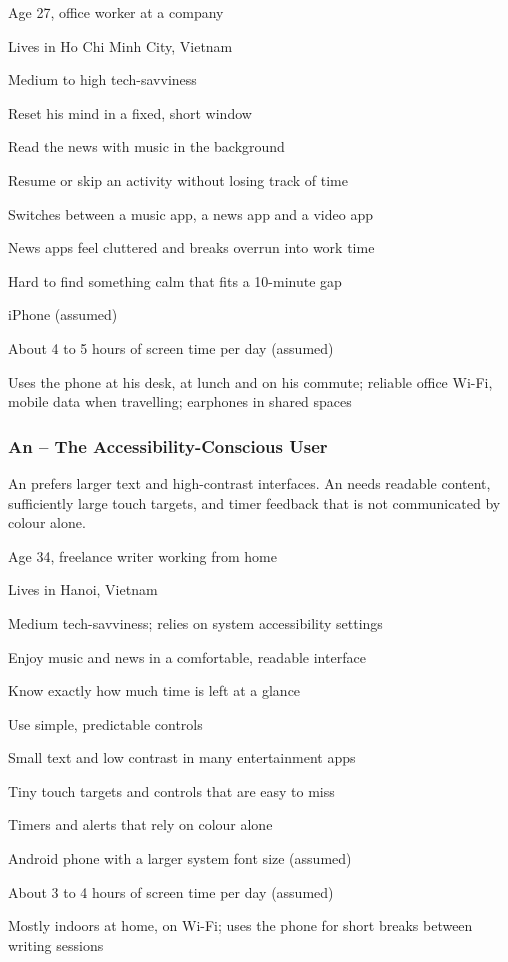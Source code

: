   {\item Age 27, office worker at a company
   \item Lives in Ho Chi Minh City, Vietnam
   \item Medium to high tech-savviness}
  {\item Reset his mind in a fixed, short window
   \item Read the news with music in the background
   \item Resume or skip an activity without losing track of time}
  {\item Switches between a music app, a news app and a video app
   \item News apps feel cluttered and breaks overrun into work time
   \item Hard to find something calm that fits a 10-minute gap}
  {\item iPhone (assumed)
   \item About 4 to 5 hours of screen time per day (assumed)
   \item Uses the phone at his desk, at lunch and on his commute; reliable
         office Wi-Fi, mobile data when travelling; earphones in shared
         spaces}

\subsubsection{An -- The Accessibility-Conscious User}

An prefers larger text and high-contrast interfaces. An needs readable
content, sufficiently large touch targets, and timer feedback that is not
communicated by colour alone.

  {\item Age 34, freelance writer working from home
   \item Lives in Hanoi, Vietnam
   \item Medium tech-savviness; relies on system accessibility settings}
  {\item Enjoy music and news in a comfortable, readable interface
   \item Know exactly how much time is left at a glance
   \item Use simple, predictable controls}
  {\item Small text and low contrast in many entertainment apps
   \item Tiny touch targets and controls that are easy to miss
   \item Timers and alerts that rely on colour alone}
  {\item Android phone with a larger system font size (assumed)
   \item About 3 to 4 hours of screen time per day (assumed)
   \item Mostly indoors at home, on Wi-Fi; uses the phone for short breaks
         between writing sessions}